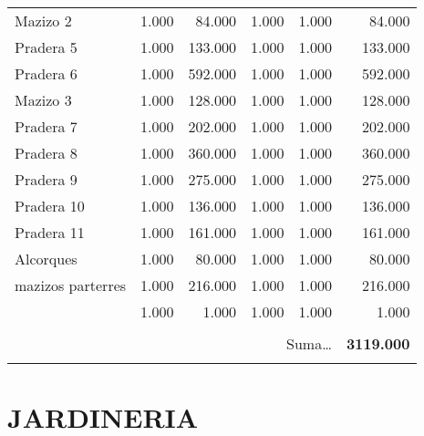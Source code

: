 \documentclass{book}%
\begin{document}
\begin{longtable}{lrrrrr}
\multicolumn{1}{p{3.5cm}}{Mazizo 2}&1.000&84.000&1.000&1.000&84.000\\%
\multicolumn{1}{p{3.5cm}}{Pradera 5}&1.000&133.000&1.000&1.000&133.000\\%
\multicolumn{1}{p{3.5cm}}{Pradera 6}&1.000&592.000&1.000&1.000&592.000\\%
\multicolumn{1}{p{3.5cm}}{Mazizo 3}&1.000&128.000&1.000&1.000&128.000\\%
\multicolumn{1}{p{3.5cm}}{Pradera 7}&1.000&202.000&1.000&1.000&202.000\\%
\multicolumn{1}{p{3.5cm}}{Pradera 8}&1.000&360.000&1.000&1.000&360.000\\%
\multicolumn{1}{p{3.5cm}}{Pradera 9}&1.000&275.000&1.000&1.000&275.000\\%
\multicolumn{1}{p{3.5cm}}{Pradera 10}&1.000&136.000&1.000&1.000&136.000\\%
\multicolumn{1}{p{3.5cm}}{Pradera 11}&1.000&161.000&1.000&1.000&161.000\\%
\multicolumn{1}{p{3.5cm}}{Alcorques}&1.000&80.000&1.000&1.000&80.000\\%
\multicolumn{1}{p{3.5cm}}{mazizos parterres}&1.000&216.000&1.000&1.000&216.000\\%
\multicolumn{1}{p{3.5cm}}{}&1.000&1.000&1.000&1.000&1.000\\%
&&&&&\\%
\multicolumn{5}{r}{Suma\ldots}&\textbf{3119.000}\\%
\hline%
&&&&&\\%
\end{longtable}%
\newpage

%
\section{JARDINERIA}%
\label{sec:JARDINERIA}%
\end{document}
